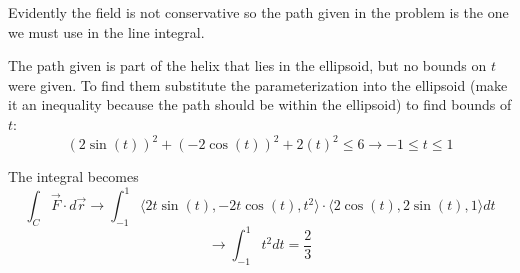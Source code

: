 \documentclass{article}
\begin{document}
Evidently the field is not conservative so the path given in the problem is the one we must use in the line integral.

The path given is part of the helix that lies in the ellipsoid, but no bounds on $t$ were given. To find them substitute the parameterization into the ellipsoid (make it an inequality because the path should be within the ellipsoid) to find bounds of $t$:
$$(2\sin(t))^2 + (-2\cos(t))^2 +2(t)^2 \leq 6 \to -1 \leq t \leq 1$$

The integral becomes $$\int_C\vec{F}\cdot d\vec{r} \to \int_{-1}^1 \langle 2t\sin(t), -2t\cos(t) ,t^2 \rangle \cdot \langle 2\cos(t), 2\sin(t) ,1 \rangle dt$$
$$\to \int_{-1}^1t^2dt = \frac{2}{3}$$
\end{document}
